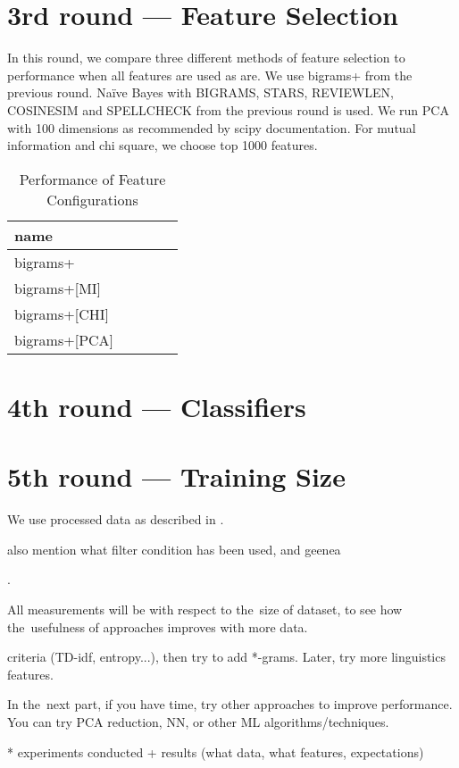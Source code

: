\section{3rd round --- Feature Selection}

In this round, we compare three different methods of feature selection to performance when all features are used as are.
We use bigrams+ from the previous round.
Na\"{i}ve Bayes with BIGRAMS, STARS, REVIEWLEN, COSINESIM and SPELLCHECK from the previous round is used.
We run PCA with 100 dimensions as recommended by scipy documentation.
For mutual information and chi square, we choose top 1000 features.

\begin{table}[h!]

\centering
\begin{tabular}{lllll}
\toprule
\textbf{name}\\	%
\midrule
bigrams+ \\
bigrams+[MI] \\
bigrams+[CHI] \\
bigrams+[PCA] \\
\bottomrule
\end{tabular}

\caption{Performance of Feature Configurations}\label{tab:feat_perf}
\end{table}

\section{4th round --- Classifiers}

\section{5th round --- Training Size}

We use processed data as described in .

also mention what filter condition has been used, and geenea


.

All measurements will be with respect to the~size of dataset, to see how the~usefulness of approaches improves with more data.

criteria (TD-idf, entropy...), then try to add *-grams. Later, try more linguistics features.

In the~next part, if you have time, try other approaches to improve performance. You can try PCA reduction, NN, or other ML algorithms/techniques.

* experiments conducted + results (what data, what features, expectations)


